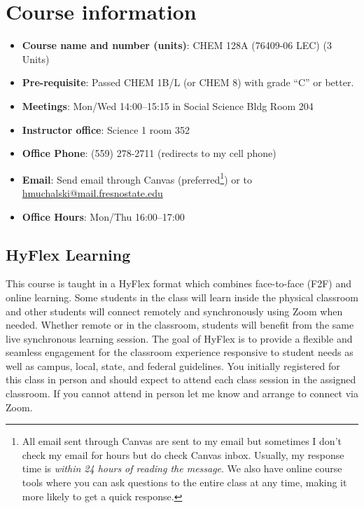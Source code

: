 \hypertarget{course-information}{%
\section{Course information}\label{course-information}}

\begin{itemize}
\tightlist
\item
  \textbf{Course name and number (units)}: CHEM 128A (76409-06 LEC) (3
  Units)
\item
  \textbf{Pre-requisite}: Passed CHEM 1B/L (or CHEM 8) with grade ``C''
  or better.
\item
  \textbf{Meetings}: Mon/Wed 14:00--15:15 in Social Science Bldg Room
  204
\item
  \textbf{Instructor office}: Science 1 room 352
\item
  \textbf{Office Phone}: (559) 278-2711 (redirects to my cell phone)
\item
  \textbf{Email}: Send email through Canvas (preferred\footnote{All
    email sent through Canvas are sent to my email but sometimes I don't
    check my email for hours but do check Canvas inbox. Usually, my
    response time is \emph{within 24 hours of reading the message}. We
    also have online course tools where you can ask questions to the
    entire class at any time, making it more likely to get a quick
    response.}) or to \url{hmuchalski@mail.fresnostate.edu}
\item
  \textbf{Office Hours}: Mon/Thu 16:00--17:00
\end{itemize}

\hypertarget{hyflex-learning}{%
\subsection{HyFlex Learning}\label{hyflex-learning}}

This course is taught in a HyFlex format which combines face-to-face
(F2F) and online learning. Some students in the class will learn inside
the physical classroom and other students will connect remotely and
synchronously using Zoom when needed. Whether remote or in the
classroom, students will benefit from the same live synchronous learning
session. The goal of HyFlex is to provide a flexible and seamless
engagement for the classroom experience responsive to student needs as
well as campus, local, state, and federal guidelines. You initially
registered for this class in person and should expect to attend each
class session in the assigned classroom. If you cannot attend in person
let me know and arrange to connect via Zoom.


